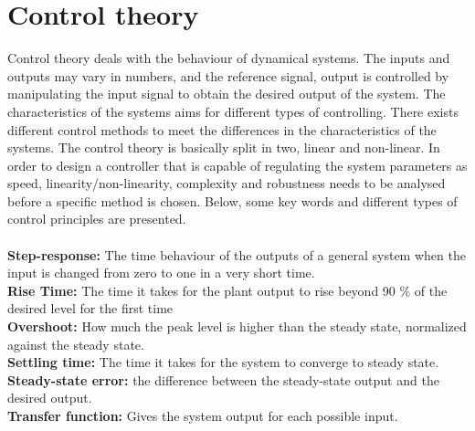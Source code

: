 \section{Control theory}
Control theory deals with the behaviour of dynamical systems. The inputs and outputs may vary in numbers, and the reference signal, output is controlled by manipulating the input signal to obtain the desired output of the system. The characteristics of the systems aims for different types of controlling. There exists different control methods to meet the differences in the characteristics of the systems. The control theory is basically split in two, linear and non-linear. In order to design a controller that is capable of regulating the system parameters as speed, linearity/non-linearity, complexity and robustness needs to be analysed before a specific method is chosen. Below, some key words and different types of control principles are presented. \\
\\
\textbf{Step-response:} The time behaviour of the outputs of a general system when the input is changed from zero to one in a very short time. \\
\textbf{Rise Time:} The time it takes for the plant output to rise beyond 90 \% of the desired level for the first time\\
\textbf{Overshoot:} How much the peak level is higher than the steady state, normalized against the steady state.\\ \textbf{Settling time:} The time it takes for the system to converge to steady state.\\
\textbf{Steady-state error:} the difference between the steady-state output and the desired output.\\
\textbf{Transfer function:} Gives the system output for each possible input.\\


